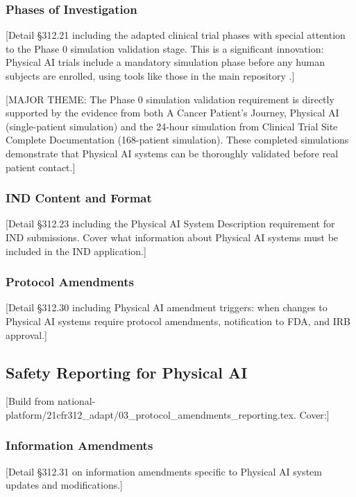 \subsubsection{Phases of Investigation}
[Detail \S 312.21 including the adapted clinical trial phases with special
attention to the Phase 0 simulation validation stage. This is a significant
innovation: Physical AI trials include a mandatory simulation phase before any
human subjects are enrolled, using tools like those in the main repository
\cite{main-repo}.]

[MAJOR THEME: The Phase 0 simulation validation requirement is directly
supported by the evidence from both A Cancer Patient's Journey, Physical AI
\cite{patient-journey-paper} (single-patient simulation) and the 24-hour
simulation from Clinical Trial Site Complete Documentation \cite{site-docs}
(168-patient simulation). These completed simulations demonstrate that
Physical AI systems can be thoroughly validated before real patient contact.]

\subsubsection{IND Content and Format}
[Detail \S 312.23 including the Physical AI System Description requirement
for IND submissions. Cover what information about Physical AI systems must
be included in the IND application.]

\subsubsection{Protocol Amendments}
[Detail \S 312.30 including Physical AI amendment triggers: when changes to
Physical AI systems require protocol amendments, notification to FDA, and
IRB approval.]

\subsection{Safety Reporting for Physical AI}
\label{subsec:cfr312-safety}

[Build from national-platform/21cfr312\_adapt/03\_protocol\_amendments\_reporting.tex.
Cover:]

\subsubsection{Information Amendments}
[Detail \S 312.31 on information amendments specific to Physical AI system
updates and modifications.]

